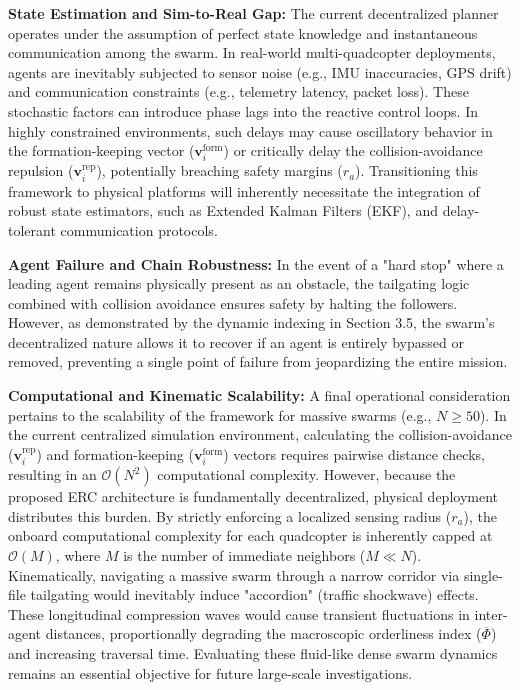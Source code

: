 \documentclass[pdflatex,sn-basic]{sn-jnl}%
\begin{document}
        \textbf{State Estimation and Sim-to-Real Gap:} The current decentralized planner operates under the assumption of perfect state knowledge and instantaneous communication among the swarm. In real-world multi-quadcopter deployments, agents are inevitably subjected to sensor noise (e.g., IMU inaccuracies, GPS drift) and communication constraints (e.g., telemetry latency, packet loss). These stochastic factors can introduce phase lags into the reactive control loops. In highly constrained environments, such delays may cause oscillatory behavior in the formation-keeping vector ($\boldsymbol{v}_i^{\text{form}}$) or critically delay the collision-avoidance repulsion ($\boldsymbol{v}_i^{\text{rep}}$), potentially breaching safety margins ($r_a$). Transitioning this framework to physical platforms will inherently necessitate the integration of robust state estimators, such as Extended Kalman Filters (EKF), and delay-tolerant communication protocols.

        \textbf{Agent Failure and Chain Robustness:} In the event of a "hard stop" where a leading agent remains physically present as an obstacle, the tailgating logic combined with collision avoidance ensures safety by halting the followers. However, as demonstrated by the dynamic indexing in Section 3.5, the swarm's decentralized nature allows it to recover if an agent is entirely bypassed or removed, preventing a single point of failure from jeopardizing the entire mission.

        \textbf{Computational and Kinematic Scalability:} A final operational consideration pertains to the scalability of the framework for massive swarms (e.g., $N \ge 50$). In the current centralized simulation environment, calculating the collision-avoidance ($\boldsymbol{v}_i^{\text{rep}}$) and formation-keeping ($\boldsymbol{v}_i^{\text{form}}$) vectors requires pairwise distance checks, resulting in an $\mathcal{O}(N^2)$ computational complexity. However, because the proposed ERC architecture is fundamentally decentralized, physical deployment distributes this burden. By strictly enforcing a localized sensing radius ($r_a$), the onboard computational complexity for each quadcopter is inherently capped at $\mathcal{O}(M)$, where $M$ is the number of immediate neighbors ($M \ll N$). Kinematically, navigating a massive swarm through a narrow corridor via single-file tailgating would inevitably induce "accordion" (traffic shockwave) effects. These longitudinal compression waves would cause transient fluctuations in inter-agent distances, proportionally degrading the macroscopic orderliness index ($\overline{\Phi}$) and increasing traversal time. Evaluating these fluid-like dense swarm dynamics remains an essential objective for future large-scale investigations.
\end{document}
